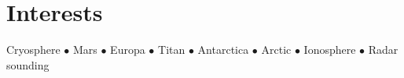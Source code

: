 \section*{Interests}

Cryosphere $\bullet$ Mars $\bullet$ Europa $\bullet$ Titan $\bullet$ Antarctica $\bullet$ Arctic $\bullet$ Ionosphere $\bullet$ Radar sounding